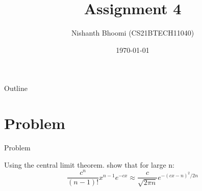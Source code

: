 \documentclass{beamer}
\title{Assignment 4}
\author{Nishanth Bhoomi (CS21BTECH11040)}
\date{\today}
\begin{document}
\begin{frame}
    \titlepage 
\end{frame}

\logo{}

\let\vec\textbf

\begin{frame}{Outline}
    \tableofcontents
\end{frame}



\section{Problem }
\begin{frame}{Problem }

    \begin{block}{}
      Using the central limit theorem. show that for large n:
        \begin{equation}
            \frac{c^n}{(n-1)!}x^{n-1}e^{-cx} \approx \frac{c}{\sqrt{2\pi n}}e^{-(cx-n)^2/2n}
        \end{equation}
    \end{block}
\end{frame}
\end{document}
